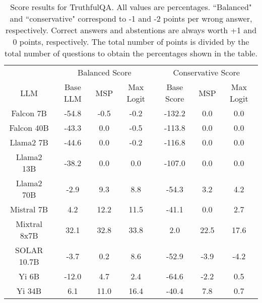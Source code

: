 \renewcommand\arraystretch{1.2}
\begin{table*}
\centering
\begin{tabular}{c|c|c|c|c|c|c}
& \multicolumn{3}{c|}{Balanced Score} & \multicolumn{3}{c}{Conservative Score} \\ 
LLM & Base LLM & MSP & Max Logit & Base Score & MSP & Max Logit\\ \hline
Falcon 7B & -54.8 & -0.5 & -0.2 & -132.2 & 0.0 & 0.0\\
Falcon 40B & -43.3 & 0.0 & -0.5 & -113.8 & 0.0 & 0.0\\
Llama2 7B & -44.6 & 0.0 & -0.2 & -116.8 & 0.0 & 0.0\\
Llama2 13B & -38.2 & 0.0 & 0.0 & -107.0 & 0.0 & 0.0\\
Llama2 70B & -2.9 & 9.3 & 8.8 & -54.3 & 3.2 & 4.2\\
Mistral 7B & 4.2 & 12.2 & 11.5 & -41.1 & 0.0 & 2.7\\
Mixtral 8x7B & 32.1 & 32.8 & 33.8 & 2.0 & 22.5 & 17.6\\
SOLAR 10.7B & -3.7 & 0.2 & 8.6 & -52.9 & -3.9 & -4.2\\
Yi 6B & -12.0 & 4.7 & 2.4 & -64.6 & -2.2 & 0.5\\
Yi 34B & 6.1 & 11.0 & 16.4 & -40.4 & 7.8 & 0.7\\
\hline
\end{tabular}
\caption{Score results for TruthfulQA. All values are percentages. ``Balanced" and ``conservative" correspond to -1 and -2 points per wrong answer, respectively. Correct answers and abstentions are always worth +1 and 0 points, respectively. The total number of points is divided by the total number of questions to obtain the percentages shown in the table.}
\label{tab:truthfulqa_score}
\end{table*}
